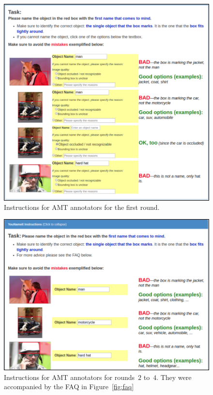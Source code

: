 \documentclass[11pt,a4paper]{article}
\begin{document}
\begin{figure}[htb]
  \centering
  \includegraphics[width=1.5\columnwidth]{figures/round0.png}
  \caption{Instructions for AMT annotators for the first round.}
  \label{fig:instructions1}
\end{figure}

\begin{figure}[htb]
  \centering
  \includegraphics[width=1.5\columnwidth]{figures/round1+_p1.png}
  \caption{Instructions for AMT annotators for rounds~$2$ to~$4$. They were accompanied by the FAQ in Figure~\ref{fig:faq}}
  \label{fig:instructions2}
\end{figure}
\end{document}
